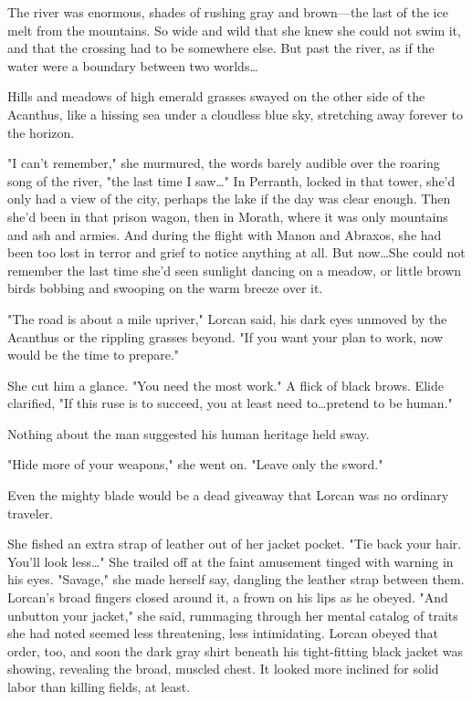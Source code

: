 The river was enormous, shades of rushing gray and brown---the last of the ice melt from the mountains.
So wide and wild that she knew she could not swim it, and that the crossing had to be somewhere else.
But past the river, as if the water were a boundary between two worlds\ldots{}

Hills and meadows of high emerald grasses swayed on the other side of the Acanthus, like a hissing sea under a cloudless blue sky, stretching away forever to the horizon.

"I can't remember," she murmured, the words barely audible over the roaring song of the river, "the last time I saw\ldots" In Perranth, locked in that tower, she'd only had a view of the city, perhaps the lake if the day was clear enough.
Then she'd been in that prison wagon, then in Morath, where it was only mountains and ash and armies.
And during the flight with Manon and Abraxos, she had been too lost in terror and grief to notice anything at all.
But now\ldots She could not remember the last time she'd seen sunlight dancing on a meadow, or little brown birds bobbing and swooping on the warm breeze over it.

"The road is about a mile upriver," Lorcan said, his dark eyes unmoved by the Acanthus or the rippling grasses beyond.
"If you want your plan to work, now would be the time to prepare."

She cut him a glance.
"You need the most work."
A flick of black brows.
Elide clarified, "If this ruse is to succeed, you at least need to\ldots pretend to be human."

Nothing about the man suggested his human heritage held sway.

"Hide more of your weapons," she went on.
"Leave only the sword."

Even the mighty blade would be a dead giveaway that Lorcan was no ordinary traveler.

She fished an extra strap of leather out of her jacket pocket.
"Tie back your hair.
You'll look less\ldots" She trailed off at the faint amusement tinged with warning in his eyes.
"Savage," she made herself say, dangling the leather strap between them.
Lorcan's broad fingers closed around it, a frown on his lips as he obeyed.
"And unbutton your jacket," she said, rummaging through her mental catalog of traits she had noted seemed less threatening, less intimidating.
Lorcan obeyed that order, too, and soon the dark gray shirt beneath his tight-fitting black jacket was showing, revealing the broad, muscled chest.
It looked more inclined for solid labor than killing fields, at least.

